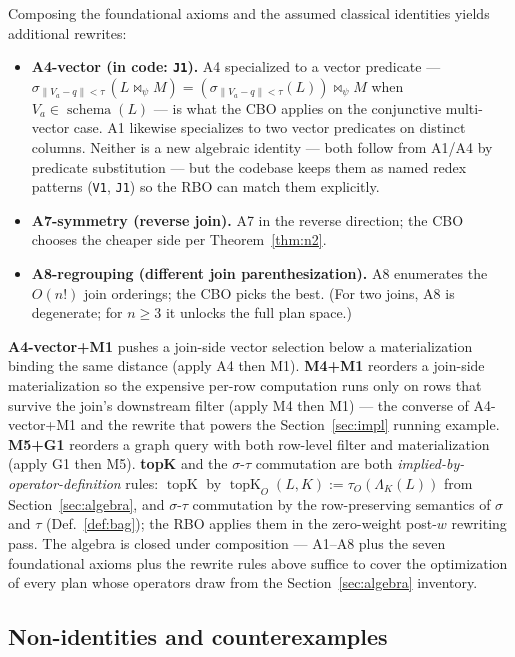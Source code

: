 \documentclass[acmsmall,review,anonymous]{acmart}
\theoremstyle{plain}
\theoremstyle{definition}
\newcommand{\schema}[1]{\operatorname{schema}(#1)}
\newcommand{\topK}{\operatorname{topK}}
\theoremstyle{remark}
\begin{document}
Composing the foundational axioms and the assumed classical
identities yields additional rewrites:
\begin{itemize}[leftmargin=*]
  \item \textbf{A4-vector (in code: \texttt{J1}).} A4 specialized
    to a vector predicate --- $\sigma_{\lVert V_a - q \rVert < \tau}\,
    (L \bowtie_\psi M) = (\sigma_{\lVert V_a - q \rVert < \tau}(L))
    \bowtie_\psi M$ when $V_a \in \schema{L}$ --- is what the CBO
    applies on the conjunctive multi-vector case. A1 likewise
    specializes to two vector predicates on distinct columns.
    Neither is a new algebraic identity --- both follow from
    A1/A4 by predicate substitution --- but the codebase keeps
    them as named redex patterns (\texttt{V1}, \texttt{J1}) so the
    RBO can match them explicitly.
  \item \textbf{A7-symmetry (reverse join).} A7 in the reverse
    direction; the CBO chooses the cheaper side per
    Theorem~\ref{thm:n2}.
  \item \textbf{A8-regrouping (different join parenthesization).}
    A8 enumerates the $O(n!)$ join orderings; the CBO picks the
    best. (For two joins, A8 is degenerate; for $n \geq 3$ it
    unlocks the full plan space.)
\end{itemize}
\textbf{A4-vector+M1} pushes a join-side vector selection below a
materialization binding the same distance (apply A4 then M1).
\textbf{M4+M1} reorders a join-side materialization so the
expensive per-row computation runs only on rows that survive the
join's downstream filter (apply M4 then M1) --- the converse of
A4-vector+M1 and the rewrite that powers the
Section~\ref{sec:impl} running example. \textbf{M5+G1} reorders
a graph query with both row-level filter and materialization
(apply G1 then M5).
\textbf{topK} and the $\sigma$-$\tau$ commutation are both
\emph{implied-by-operator-definition} rules: $\topK$ by
$\topK_O(L, K) := \tau_O(\Lambda_K(L))$ from
Section~\ref{sec:algebra}, and $\sigma$-$\tau$ commutation by the
row-preserving semantics of $\sigma$ and $\tau$
(Def.~\ref{def:bag}); the RBO applies them in the zero-weight
post-$w$ rewriting pass. The algebra is closed under composition
--- A1--A8 plus the seven foundational axioms plus the rewrite
rules above suffice to cover the optimization of every plan whose
operators draw from the Section~\ref{sec:algebra} inventory.

\subsection{Non-identities and counterexamples}\label{sec:equational:nonident}
\end{document}

